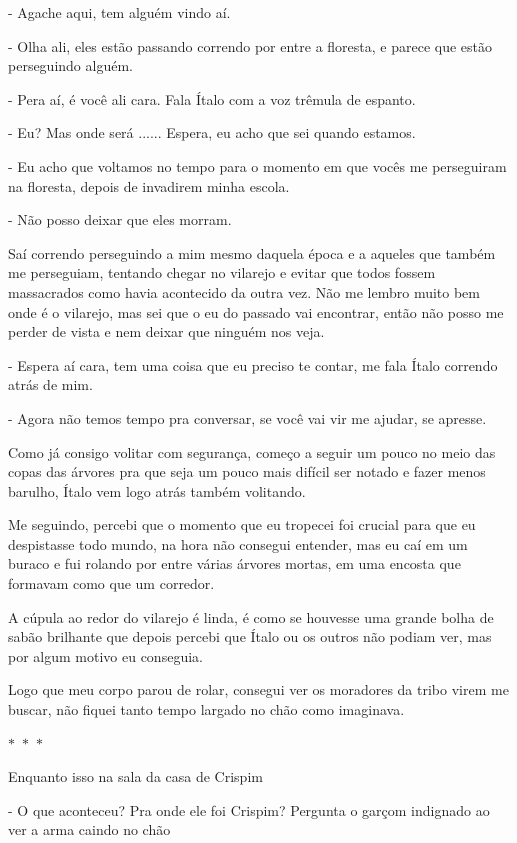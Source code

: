 - Agache aqui, tem alguém vindo aí.

- Olha ali, eles estão passando correndo por entre a floresta, e parece que estão perseguindo alguém.

- Pera aí, é você ali cara. Fala Ítalo com a voz trêmula de espanto.

- Eu? Mas onde será ...... Espera, eu acho que sei quando estamos.

- Eu acho que voltamos no tempo para o momento em que vocês me perseguiram na floresta, depois de invadirem minha escola.

- Não posso deixar que eles morram.

Saí correndo perseguindo a mim mesmo daquela época e a aqueles que também me perseguiam, tentando chegar no vilarejo e evitar que todos fossem massacrados como havia acontecido da outra vez. Não me lembro muito bem onde é o vilarejo, mas sei que o eu do passado vai encontrar, então não posso me perder de vista e nem deixar que ninguém nos veja.

- Espera aí cara, tem uma coisa que eu preciso te contar, me fala Ítalo correndo atrás de mim.

- Agora não temos tempo pra conversar, se você vai vir me ajudar, se apresse.

Como já consigo volitar com segurança, começo a seguir um pouco no meio das copas das árvores pra que seja um pouco mais difícil ser notado e fazer menos barulho, Ítalo vem logo atrás também volitando.

Me seguindo, percebi que o momento que eu tropecei foi crucial para que eu despistasse todo mundo, na hora não consegui entender, mas eu caí em um buraco e fui rolando por entre várias árvores mortas, em uma encosta que formavam como que um corredor.

A cúpula ao redor do vilarejo é linda, é como se houvesse uma grande bolha de sabão brilhante que depois percebi que Ítalo ou os outros não podiam ver, mas por algum motivo eu conseguia.

Logo que meu corpo parou de rolar, consegui ver os moradores da tribo virem me buscar, não fiquei tanto tempo largado no chão como imaginava.

\begin{center}
  $\ast$~$\ast$~$\ast$
\end{center}

Enquanto isso na sala da casa de Crispim

- O que aconteceu? Pra onde ele foi Crispim? Pergunta o garçom indignado ao ver a arma caindo no chão

